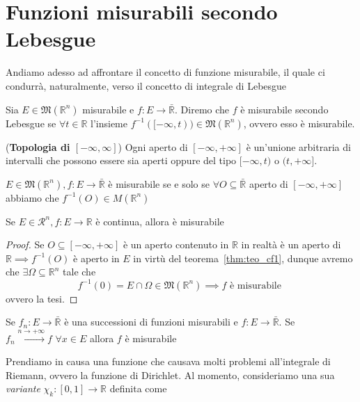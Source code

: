 \section{Funzioni misurabili secondo Lebesgue}
Andiamo adesso ad affrontare il concetto di funzione misurabile, il quale ci condurrà, naturalmente, verso il concetto di integrale di Lebesgue
\begin{definition}
Sia $E \in \mathfrak{M}(\mathbb{R}^n)$ misurabile e $f: E \to \bar{\mathbb{R}}$. Diremo che $f$ è misurabile secondo Lebesgue se $\forall t \in \mathbb{R}$ l'insieme $f^{-1}([-\infty, t)) \in \mathfrak{M}(\mathbb{R}^n)$, ovvero esso è misurabile.
\end{definition}
\begin{remark}(\textbf{Topologia di $[-\infty, \infty]$})
	Ogni aperto di $[-\infty, +\infty]$ è un'unione arbitraria di intervalli che possono essere sia aperti oppure del tipo $[-\infty, t)$ o $(t, +\infty]$.
\end{remark}
\begin{prop}
	$E \in \mathfrak{M}(\mathbb{R}^n), f: E \to \bar{\mathbb{R}}$ è misurabile se e solo se $\forall O \subseteq \bar{\mathbb{R}}$ aperto di $[-\infty, +\infty]$ abbiamo che $f^{-1}(O) \in M(\mathbb{R}^n)$
\end{prop}
\begin{prop}
	Se $E \in \mathcal{R}^n, f: E \to \mathbb{R}$ è continua, allora è misurabile
\end{prop}
\begin{proof}
	Se $O \subseteq [-\infty, +\infty]$ è un aperto contenuto in $\mathbb{R}$ in realtà è un aperto di $\mathbb{R} \implies f^{-1}(O)$ è aperto in $E$ in virtù del teorema~\ref{thm:teo_cf1}, dunque avremo che $\exists \Omega \subseteq \mathbb{R}^n$ tale che
	$$
	f^{-1}(0) = E \cap \Omega \in \mathfrak{M}(\mathbb{R}^n) \implies f \text{ è misurabile }
	$$
	ovvero la tesi.
\end{proof}
\begin{prop}
	Se $f_n: E \to \bar{\mathbb{R}}$ è una successioni di funzioni misurabili e $f:E \to \bar{\mathbb{R}}$. Se $f_n \stackrel{n \to +\infty}{\to} f \, \, \forall x \in E$ allora $f$ è misurabile
\end{prop}
Prendiamo in causa una funzione che causava molti problemi all'integrale di Riemann, ovvero la funzione di Dirichlet. Al momento, consideriamo una sua \emph{variante} $\chi_k: [0, 1] \to \mathbb{R}$ definita come
